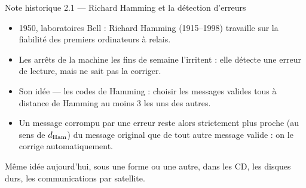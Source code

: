 \begin{frame}{Note historique 2.1 --- Richard Hamming et la détection d'erreurs}
  \small
  \begin{itemize}
    \item 1950, laboratoires Bell : Richard Hamming (1915--1998)
      travaille sur la fiabilité des premiers ordinateurs à relais.
    \item Les arrêts de la machine les fins de semaine l'irritent : elle
      détecte une erreur de lecture, mais ne sait pas la
      corriger.
    \item Son idée --- les codes de Hamming : choisir les messages
      valides tous à distance de Hamming au moins 3 les uns des
      autres.
    \item Un message corrompu par une erreur reste alors
      strictement plus proche (au sens de $d_{\mathrm{Ham}}$) du message original
      que de tout autre message valide : on le corrige automatiquement.
  \end{itemize}
  \vspace{4pt}
  Même idée aujourd'hui, sous une forme ou une autre, dans les CD, les
  disques durs, les communications par satellite.
\end{frame}
